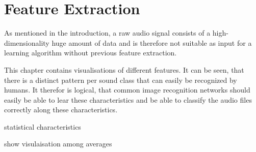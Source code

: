 


\newpage


\section{Feature Extraction}

As mentioned in the introduction, a raw audio signal consists of a high-dimensionality huge amount of data and is therefore not suitable as input for a learning algorithm without previous feature extraction.

This chapter contains visualisations of different features. It can be seen, that there is a distinct pattern per sound class that can easily be recognized by humans. It therefor is logical, that common image recognition networks should easily be able to lear these characteristics and be able to classify the audio files correctly along these characteristics.

statistical characteristics

show visulaisation among averages



